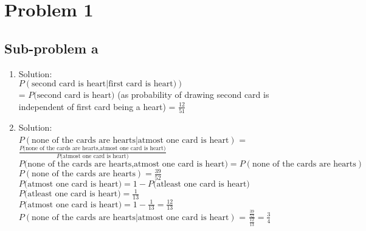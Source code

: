 \section*{Problem 1}
  \subsection*{Sub-problem a}
  \begin{enumerate}
  \item Solution:\\
  $P(\text{second card is heart$|$first card is heart)})$\\
  = $P\text{(second card is heart)}$ (as probability of drawing second card is
  independent of first card being a heart)
  = $\frac{12}{51}$
  \item Solution: \\
  $P(\text{none of the cards are hearts$|$atmost one card is heart})$ = \\
  $\frac {P\text{(none of the cards are hearts,atmost one card is
  heart)}}
  {P\text{(atmost one card is heart)}}$ \\
  $P\text{(none of the cards are hearts,atmost one card is
    heart)} = P(\text{none of the cards are hearts})$ \\
  $P(\text{none of the cards are hearts}) = \frac{39}{52}$\\
  ${P\text{(atmost one card is heart)}} = 1 - {P\text{(atleast one card
  is heart)}}$ \\
  ${P\text{(atleast one card is heart)}} = \frac{1}{13}$ \\
  ${P\text{(atmost one card is heart)}} = 1 - \frac{1}{13} =
  \frac{12}{13}$\\
  $P(\text{none of the cards are hearts$|$atmost one card is
  heart})$ = $\frac{\frac{39}{52}}{\frac{12}{13}} = \frac{3}{4}$
  \end{enumerate}
